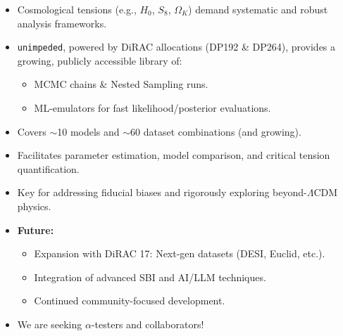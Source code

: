 \documentclass[aspectratio=169]{beamer}
\begin{document}
\begin{frame}
\begin{itemize}
            \item Cosmological tensions (e.g., $H_0$, $S_8$, $\Omega_K$) demand systematic and robust analysis frameworks.
            \item \texttt{unimpeded}, powered by DiRAC allocations (DP192 \& DP264), provides a growing, publicly accessible library of:
                \begin{itemize}
                    \item MCMC chains \& Nested Sampling runs.
                    \item ML-emulators for fast likelihood/posterior evaluations.
                \end{itemize}
            \item Covers $\sim$10 models and $\sim$60 dataset combinations (and growing).
            \item Facilitates parameter estimation, model comparison, and critical tension quantification.
            \item Key for addressing fiducial biases and rigorously exploring beyond-$\Lambda$CDM physics.
            \item \textbf{Future:}
                \begin{itemize}
                    \item Expansion with DiRAC 17: Next-gen datasets (DESI, Euclid, etc.).
                    \item Integration of advanced SBI and AI/LLM techniques.
                    \item Continued community-focused development.
                \end{itemize}
            \item We are seeking $\alpha$-testers and collaborators!
        \end{itemize}
\end{frame}
\end{document}
